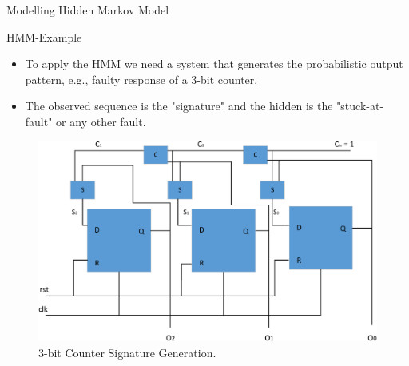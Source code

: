 \documentclass[aspectratio=1610]{beamer}
\begin{document}
\begin{frame}{Modelling Hidden Markov Model}

\begin{block}{HMM-Example}

\end{block}

\begin{itemize}

\item To apply the HMM we need a system that generates the probabilistic output pattern, e.g., faulty response of a 3-bit counter.

\item The observed sequence is the "signature" and the hidden is the "stuck-at-fault" or any other fault.




\end{itemize}





\begin{figure}[tb!]
 \centering
  \captionsetup{justification=centering}    
   \includegraphics[scale=0.3]{Figures/counter.pdf}
   \caption{3-bit Counter Signature Generation.}
\label{fig:counter}
\end{figure}
\end{frame}
\end{document}
